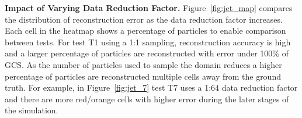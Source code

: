 \textbf{Impact of Varying Data Reduction Factor.} Figure~\ref{fig:jet_map} compares the distribution of reconstruction error as the data reduction factor increases. 
%
Each cell in the heatmap shows a percentage of particles to enable comparison between tests.
%
For test T1 using a 1:1 sampling, reconstruction accuracy is high and a larger percentage of particles are reconstructed with error under 100\% of GCS.
%
As the number of particles used to sample the domain reduces a higher percentage of particles are reconstructed multiple cells away from the ground truth. 
%
For example, in Figure~\ref{fig:jet_7} test T7 uses a 1:64 data reduction factor and there are more red/orange cells with higher error during the later stages of the simulation. 
%
%
%
%


